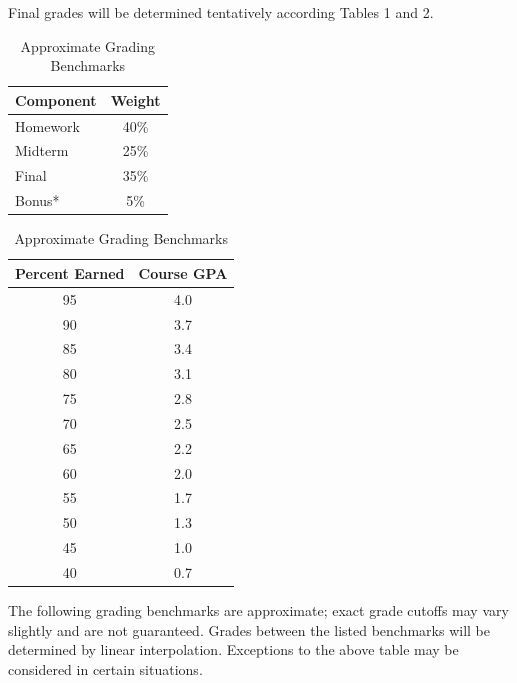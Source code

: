 \documentclass[11pt]{article}
\begin{document}
Final grades will be determined tentatively according Tables 1 and 2.
\begin{table}[ht]
\centering

\renewcommand{\arraystretch}{1.25}

\begin{minipage}{0.46\textwidth}
\centering
\caption{Course Components and Weights}
\label{tab:grading-components}

\begin{tabular}{@{}lc@{}}
\toprule
\textbf{Component} & \textbf{Weight} \\
\midrule
Homework & 40\% \\
Midterm & 25\% \\
Final & 35\% \\
\midrule
Bonus* & 5\% \\
\bottomrule
\end{tabular}

\end{minipage}
\hfill
\begin{minipage}{0.46\textwidth}
\centering
\caption{Approximate Grading Benchmarks}
\label{tab:grading-benchmarks}

\renewcommand{\arraystretch}{0.87}

\begin{tabular}{@{}cc@{}}
\toprule
\textbf{Percent Earned} & \textbf{Course GPA} \\
\midrule
95 & 4.0 \\
90 & 3.7 \\
85 & 3.4 \\
80 & 3.1 \\
75 & 2.8 \\
70 & 2.5 \\
65 & 2.2 \\
60 & 2.0 \\
55 & 1.7 \\
50 & 1.3 \\
45 & 1.0 \\
40 & 0.7 \\
\bottomrule
\end{tabular}

\end{minipage}

\end{table}



The following grading benchmarks are approximate; exact grade cutoffs may vary slightly and are not guaranteed.
Grades between the listed benchmarks will be determined by linear interpolation. Exceptions to the above table may be considered in certain situations.
\end{document}
